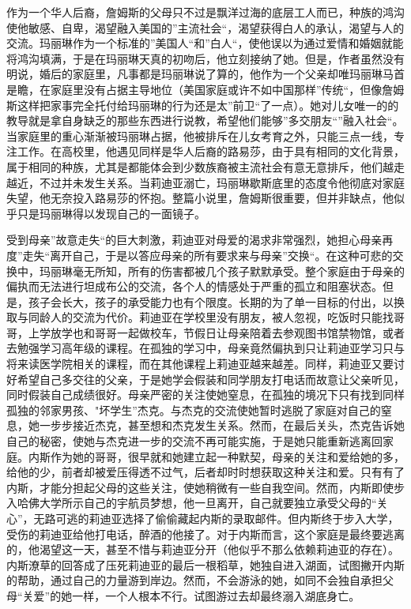 作为一个华人后裔，詹姆斯的父母只不过是飘洋过海的底层工人而已，种族的鸿沟使他敏感、自卑，渴望融入美国的”主流社会“，渴望获得白人的承认，渴望与人的交流。玛丽琳作为一个标准的”美国人“和”白人“，使他误以为通过爱情和婚姻就能将鸿沟填满，于是在玛丽琳天真的初吻后，他立刻接纳了她。但是，作者虽然没有明说，婚后的家庭里，凡事都是玛丽琳说了算的，他作为一个父亲却唯玛丽琳马首是瞻，在家庭里没有占据主导地位（美国家庭或许不如中国那样”传统“，但像詹姆斯这样把家事完全托付给玛丽琳的行为还是太”前卫“了一点）。她对儿女唯一的的教导就是拿自身缺乏的那些东西进行说教，希望他们能够”多交朋友“”融入社会“。当家庭里的重心渐渐被玛丽琳占据，他被排斥在儿女考育之外，只能三点一线，专注工作。在高校里，他遇见同样是华人后裔的路易莎，由于具有相同的文化背景，属于相同的种族，尤其是都能体会到少数族裔被主流社会有意无意排斥，他们越走越近，不过并未发生关系。当莉迪亚溺亡，玛丽琳歇斯底里的态度令他彻底对家庭失望，他无奈投入路易莎的怀抱。整篇小说里，詹姆斯很重要，但并非缺点，他似乎只是玛丽琳得以发现自己的一面镜子。

受到母亲”故意走失“的巨大刺激，莉迪亚对母爱的渴求非常强烈，她担心母亲再度”走失“离开自己，于是以答应母亲的所有要求来与母亲”交换“。在这种可悲的交换中，玛丽琳毫无所知，所有的伤害都被几个孩子默默承受。整个家庭由于母亲的偏执而无法进行坦成布公的交流，各个人的情感处于严重的孤立和阻塞状态。但是，孩子会长大，孩子的承受能力也有个限度。长期的为了单一目标的付出，以换取与同龄人的交流为代价。莉迪亚在学校里没有朋友，被人忽视，吃饭时只能找哥哥，上学放学也和哥哥一起做校车，节假日让母亲陪着去参观图书馆禁物馆，或者去勉强学习高年级的课程。在孤独的学习中，母亲竟然偏执到只让莉迪亚学习只与将来读医学院相关的课程，而在其他课程上莉迪亚越来越差。同样，莉迪亚又要讨好希望自己多交往的父亲，于是她学会假装和同学朋友打电话而故意让父亲听见，同时假装自己成绩很好。母亲严密的关注使她窒息，在孤独的境况下只有找到同样孤独的邻家男孩、"坏学生”杰克。与杰克的交流使她暂时逃脱了家庭对自己的窒息，她一步步接近杰克，甚至想和杰克发生关系。然而，在最后关头，杰克告诉她自己的秘密，使她与杰克进一步的交流不再可能实施，于是她只能重新逃离回家庭。内斯作为她的哥哥，很早就和她建立起一种默契，母亲的关注和爱给她的多，给他的少，前者却被爱压得透不过气，后者却时时想获取这种关注和爱。只有有了内斯，才能分担起父母的这些关注，使她稍微有一些自我空间。然而，内斯即使步入哈佛大学所示自己的宇航员梦想，他一旦离开，自己就要独立承受父母的“关心”，无路可逃的莉迪亚选择了偷偷藏起内斯的录取邮件。但内斯终于步入大学，受伤的莉迪亚给他打电话，醉酒的他接了。对于内斯而言，这个家庭是最终要逃离的，他渴望这一天，甚至不惜与莉迪亚分开（他似乎不那么依赖莉迪亚的存在）。内斯潦草的回答成了压死莉迪亚的最后一根稻草，她独自进入湖面，试图撇开内斯的帮助，通过自己的力量游到岸边。然而，不会游泳的她，如同不会独自承担父母“关爱”的她一样，一个人根本不行。试图游过去却最终溺入湖底身亡。

